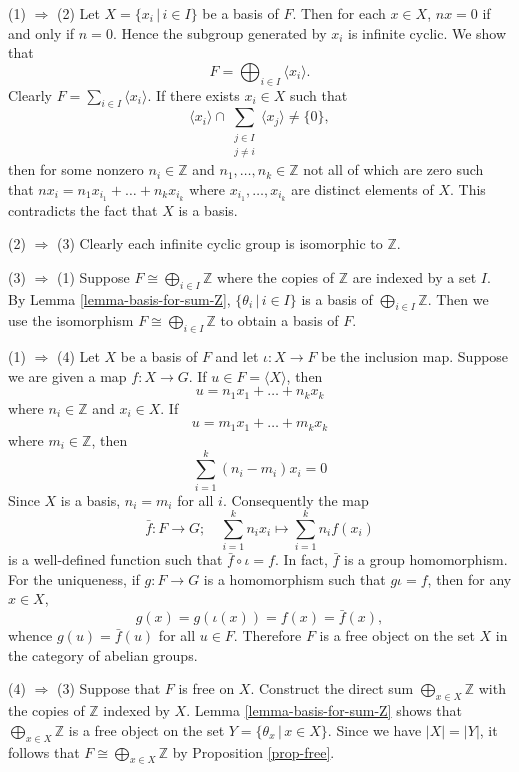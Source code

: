 \begin{sketch}
	(1) $\Rightarrow$ (2) Let $X = \{x_i\,|\, i\in I\}$ be a basis of $F$. Then for each $x \in X$, $nx = 0$ if and only if $n=0$. Hence the subgroup generated by $x_i$ is infinite cyclic. We show that \begin{equation*}
		F = \bigoplus_{i\in I} \langle x_i\rangle.
	\end{equation*} Clearly $F = \sum_{i\in I} \langle x_i\rangle$. If there exists $x_i\in X$ such that $$\langle x_i \rangle \cap \sum_{\substack{j \in I \\ j\neq i}} \langle x_j \rangle \neq \{0\},$$ then for some nonzero $n_i \in \mathbb{Z}$ and $n_{1},\dots, n_{k}\in\mathbb{Z}$ not all of which are zero such that
	$
		nx_i = n_{1} x_{i_1} + \dots + n_k  x_{i_k}
	$ where $x_{i_1}, \dots, x_{i_k}$ are distinct elements of $X$. This contradicts the fact that $X$ is a basis.
	
	(2) $\Rightarrow$ (3) Clearly each infinite cyclic group is isomorphic to $\mathbb{Z}$.
	
	(3) $\Rightarrow$ (1) Suppose $F \cong \bigoplus_{i\in I} \mathbb{Z}$ where the copies of $\mathbb{Z}$ are indexed by a set $I$. By Lemma \ref{lemma-basis-for-sum-Z}, $\{\theta_i \,|\,  i \in I\}$ is a basis of $\bigoplus_{i\in I} \mathbb{Z}$. Then we use the isomorphism $F\cong \bigoplus_{i\in I} \mathbb{Z}$ to obtain a basis of $F$.
	
	(1) $\Rightarrow$ (4) Let $X$ be a basis of $F$ and let $\iota: X \rightarrow F$ be the inclusion map. Suppose we are given a map $f: X \rightarrow G$. If $u \in F = \langle X\rangle$, then 
	\begin{equation*}
	u = n_1 x_1 + \dots + n_k x_k
	\end{equation*} where $n_i \in \mathbb{Z}$ and $x_i \in X$. If $$u = m_1 x_1 + \dots + m_k x_k$$ where $m_i \in \mathbb{Z}$, then $$\sum_{i=1}^k (n_i - m_i) x_i = 0$$ Since $X$ is a basis, $n_i = m_i$ for all $i$. Consequently the map 
	\begin{equation*}
		\bar{f}: F \rightarrow G;\quad \sum_{i=1}^k n_i x_i \mapsto \sum_{i=1}^k n_i f(x_i) 
	\end{equation*}  is a well-defined function such that $\bar{f}\circ \iota = f$. In fact, $\bar{f}$ is a group homomorphism. For the uniqueness, if $g: F \rightarrow G$ is a homomorphism such that $g \iota = f$, then for any $x \in X$, $$g(x) = g(\iota(x)) = f(x) = \bar{f}(x),$$ whence $g(u) = \bar{f}(u)$ for all $u\in F$. Therefore  $F$ is a free object on the set $X$ in the category of abelian groups.
	
	(4) $\Rightarrow$ (3) Suppose that $F$ is free on $X$. Construct the direct sum $\bigoplus_{x\in X} \mathbb{Z}$ with the copies of $\mathbb{Z}$ indexed by $X$. Lemma \ref{lemma-basis-for-sum-Z} shows that  $\bigoplus_{x\in X} \mathbb{Z}$ is a free object on the set $Y = \{\theta_x \,|\, x \in X\}$. Since we have $|X| = |Y|$, it follows that $F \cong \bigoplus_{x\in X} \mathbb{Z}$ by Proposition \ref{prop-free}.
\end{sketch}

